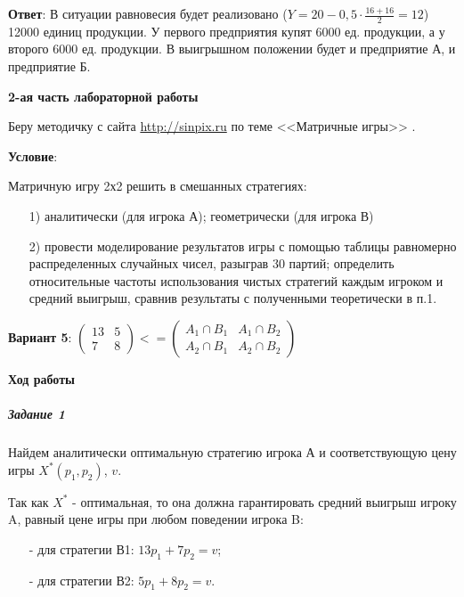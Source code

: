 \textbf{Ответ}: В ситуации равновесия будет реализовано ($Y = 20 - 0,5 \cdot \frac{16 + 16}{2} = 12$) 12000 единиц продукции.
У первого предприятия купят 6000 ед. продукции, а у второго 6000 ед. продукции.
В выигрышном положении будет и предприятие А, и предприятие Б.

\newpage

\begin{center}
  \textbf{2-ая часть лабораторной работы}
\end{center}

Беру методичку с сайта \url{http://sinpix.ru} по теме <<Матричные игры>> \cite{MethodSinpixMatrixGames}.

\textbf{Условие}: 

Матричную игру 2х2 решить в смешанных стратегиях:

\begin{enumerate}
  \item[1)] аналитически (для игрока А); геометрически (для игрока В)
  \item[2)] провести моделирование результатов игры с помощью таблицы равномерно распределенных случайных чисел, разыграв 30 партий;
  определить относительные частоты использования чистых стратегий каждым игроком и средний выигрыш,
  сравнив результаты с полученными теоретически в п.1.
\end{enumerate}

\textbf{Вариант 5}: $ \begin{pmatrix}
  13&5\\
  7&8
\end{pmatrix} <= \begin{pmatrix}
  A_1 \cap B_1 & A_1 \cap B_2\\
  A_2 \cap B_1 & A_2 \cap B_2
\end{pmatrix}$

\begin{center}
  \textbf{Ход работы}
\end{center}

\subparagraph{Задание 1} \hspace{0pt}

Найдем аналитически оптимальную стратегию игрока А и соответствующую цену игры $X^*(p_1, p_2)$, $ v $.

Так как $X^*$ - оптимальная, то она должна гарантировать средний выигрыш игроку A, равный цене игры при любом поведении игрока B:

\begin{enumerate}
  \item[-] для стратегии В1: $13 p_1 + 7 p_2 = v$;
  \item[-] для стратегии В2: $5 p_1 + 8 p_2 = v$.
\end{enumerate}

